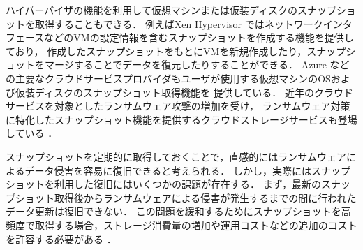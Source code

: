 ハイパーバイザの機能を利用して仮想マシンまたは仮装ディスクのスナップショットを取得することもできる．
例えばXen Hypervisor \cite{xenHV}ではネットワークインタフェースなどのVMの設定情報を含むスナップショットを作成する機能を提供しており，
作成したスナップショットをもとにVMを新規作成したり，スナップショットをマージすることでデータを復元したりすることができる．
Azure \cite{azure-backup}などの主要なクラウドサービスプロバイダもユーザが使用する仮想マシンのOSおよび仮装ディスクのスナップショット取得機能を
提供している．
近年のクラウドサービスを対象としたランサムウェア攻撃の増加\cite{zscaler-ransomware}を受け，
ランサムウェア対策に特化したスナップショット機能を提供するクラウドストレージサービスも登場している \cite{huawei-solution}．

スナップショットを定期的に取得しておくことで，直感的にはランサムウェアによるデータ侵害を容易に復旧できると考えられる．
しかし，実際にはスナップショットを利用した復旧にはいくつかの課題が存在する．
まず，最新のスナップショット取得後からランサムウェアによる侵害が発生するまでの間に行われたデータ更新は復旧できない．
この問題を緩和するためにスナップショットを高頻度で取得する場合，ストレージ消費量の増加や運用コストなどの追加のコストを許容する必要がある \cite{wang2024ransom}．



